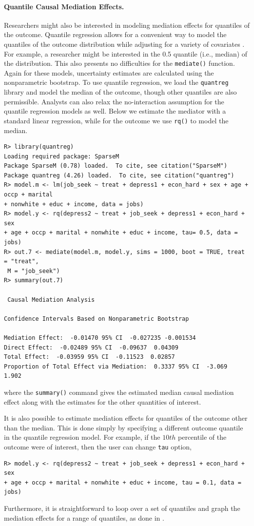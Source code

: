 \documentclass[11pt,letterpaper]{article}
\theoremstyle{plain}
\begin{document}
\paragraph{Quantile Causal Mediation Effects.}

Researchers might also be interested in modeling mediation effects for
quantiles of the outcome.  Quantile regression allows for a convenient
way to model the quantiles of the outcome distribution while adjusting
for a variety of covariates \citep{Koenker:2005}.  For example, a
researcher might be interested in the 0.5 quantile (i.e., median)
of the distribution. This also presents no difficulties for the
\texttt{mediate()} function.  Again for these models, uncertainty
estimates are calculated using the nonparametric bootstrap.  To use
quantile regression, we load the \texttt{quantreg} library and model
the median of the outcome, though other quantiles are also
permissible.  Analysts can also relax the no-interaction assumption
for the quantile regression models as well.  Below we estimate the
mediator with a standard linear regression, while for the outcome we
use \texttt{rq()} to model the median.
\begin{verbatim}
R> library(quantreg)
Loading required package: SparseM
Package SparseM (0.78) loaded.  To cite, see citation("SparseM")
Package quantreg (4.26) loaded.  To cite, see citation("quantreg")
R> model.m <- lm(job_seek ~ treat + depress1 + econ_hard + sex + age + occp + marital
+ nonwhite + educ + income, data = jobs)
R> model.y <- rq(depress2 ~ treat + job_seek + depress1 + econ_hard + sex
+ age + occp + marital + nonwhite + educ + income, tau= 0.5, data = jobs)
R> out.7 <- mediate(model.m, model.y, sims = 1000, boot = TRUE, treat = "treat",
 M = "job_seek")
R> summary(out.7)

 Causal Mediation Analysis

Confidence Intervals Based on Nonparametric Bootstrap

Mediation Effect:  -0.01470 95% CI  -0.027235 -0.001534 
Direct Effect:  -0.02489 95% CI  -0.09637  0.04309 
Total Effect:  -0.03959 95% CI  -0.11523  0.02857 
Proportion of Total Effect via Mediation:  0.3337 95% CI  -3.069  1.902 
\end{verbatim}
where the {\tt summary()} command gives the estimated median causal
mediation effect along with the estimates for the other quantities of
interest.

It is also possible to estimate mediation effects for quantiles of the
outcome other than the median. This is done simply by specifying a
different outcome quantile in the quantile regression model. For
example, if the $10th$ percentile of the outcome were of interest,
then the user can change {\tt tau} option,
\begin{verbatim}
R> model.y <- rq(depress2 ~ treat + job_seek + depress1 + econ_hard + sex
+ age + occp + marital + nonwhite + educ + income, tau = 0.1, data = jobs)
\end{verbatim}
Furthermore, it is straightforward to loop over a set of quantiles and
graph the mediation effects for a range of quantiles, as done in
\citet{imai:keel:ting:10}.
\end{document}
